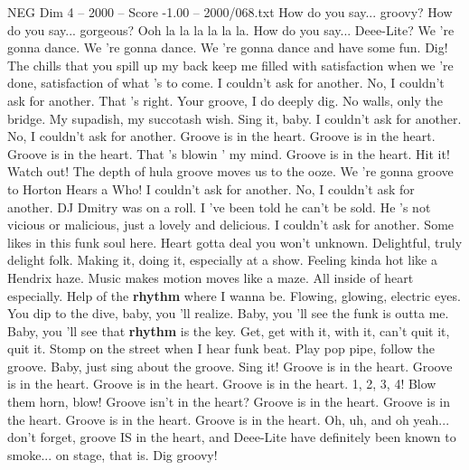\begin{textsample}{NEG Dim 4 – 2000 – Score -1.00 – 2000/068.txt}  \label{ex:f4_neg_033}
How do you say... groovy?
How do you say... gorgeous?
Ooh la la la la la la.
How do you say...
Deee-Lite?
We 're gonna dance.
We 're gonna dance.
We 're gonna dance and have some fun.
Dig!
The chills that you spill up my back keep me filled with satisfaction when we 're done, satisfaction of what 's to come.
I couldn't ask for another.
No, I couldn't ask for another.
That 's right.
Your groove, I do deeply dig.
No walls, only the bridge.
My supadish, my succotash wish.
Sing it, baby.
I couldn't ask for another.
No, I couldn't ask for another.
Groove is in the heart.
Groove is in the heart.
Groove is in the heart.
That 's blowin ' my mind.
Groove is in the heart.
Hit it!
Watch out!
The depth of hula groove moves us to the ooze.
We 're gonna groove to Horton Hears a Who!
I couldn't ask for another.
No, I couldn't ask for another.
DJ Dmitry was on a roll.
I 've been told he can't be sold.
He 's not vicious or malicious, just a lovely and delicious.
I couldn't ask for another.
Some likes in this funk soul here.
Heart gotta deal you won't unknown.
Delightful, truly delight folk.
Making it, doing it, especially at a show.
Feeling kinda hot like a Hendrix haze.
Music makes motion moves like a maze.
All inside of heart especially.
Help of the \textbf{rhythm} where I wanna be.
Flowing, glowing, electric eyes.
You dip to the dive, baby, you 'll realize.
Baby, you 'll see the funk is outta me.
Baby, you 'll see that \textbf{rhythm} is the key.
Get, get with it, with it, can't quit it, quit it.
Stomp on the street when I hear funk beat.
Play pop pipe, follow the groove.
Baby, just sing about the groove.
Sing it!
Groove is in the heart.
Groove is in the heart.
Groove is in the heart.
Groove is in the heart. 1, 2, 3, 4!
Blow them horn, blow!
Groove isn't in the heart?
Groove is in the heart.
Groove is in the heart.
Groove is in the heart.
Groove is in the heart.
Oh, uh, and oh yeah... don't forget, groove IS in the heart, and Deee-Lite have definitely been known to smoke... on stage, that is.
Dig groovy!

\end{textsample}
